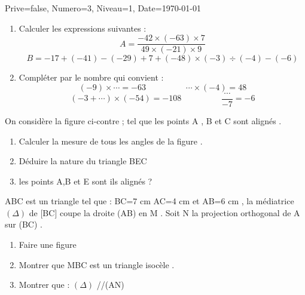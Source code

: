 \documentclass[a4paper,12pt]{article}
\begin{document}
\begin{Maquette}[DM]{Prive=false, Numero=3, Niveau=1, Date=\today}


\begin{exercice}
\begin{enumerate}
\item Calculer les expressions suivantes :
$$ A= \dfrac{-42\times (-63)\times 7}{49\times (-21)\times 9}$$
$$ B=-17+(-41)-(-29)+7+(-48)\times (-3)\div (-4)-(-6)$$
\item Compléter par le nombre qui convient :
$$ (-9)\times \cdots = -63 \hspace{2cm} \cdots \times (-4) = 48$$
$$ (-3+ \cdots )\times (-54)= -108 \hspace{2cm} \dfrac{\cdots}{-7}=-6$$ 
\end{enumerate}
\end{exercice}

\begin{exercice}
\begin{minipage}{.45\linewidth}
On considère la figure ci-contre ; tel que les points A , B et C sont alignés .
\begin{enumerate}
\item Calculer la mesure de tous les angles de la figure .
\item Déduire la nature du triangle BEC
\item les points A,B et E sont ils alignés ?
\end{enumerate}
\end{minipage}
\begin{minipage}{.55\linewidth}
\end{minipage}
\end{exercice}

\begin{exercice}
ABC est un triangle tel que : BC=7 cm AC=4 cm et AB=6 cm , la médiatrice $(\Delta)$  de [BC] coupe la droite (AB) en M .
\newline
Soit N la projection orthogonal de A sur (BC) .
\begin{enumerate}
\item Faire une figure 
\item Montrer que MBC est un triangle isocèle .
\item Montrer que : $(\Delta)$ //(AN)
\end{enumerate}
\end{exercice}

\end{Maquette}
\end{document}
